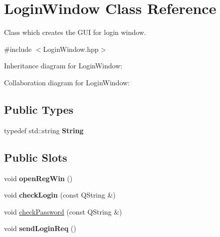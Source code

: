 \hypertarget{classLoginWindow}{}\section{Login\+Window Class Reference}
\label{classLoginWindow}


Class which creates the G\+UI for login window.  




{\ttfamily \#include $<$Login\+Window.\+hpp$>$}



Inheritance diagram for Login\+Window\+:


Collaboration diagram for Login\+Window\+:
\subsection*{Public Types}
\begin{DoxyCompactItemize}
\item 
typedef std\+::string {\bfseries String}\hypertarget{classLoginWindow_a9d5191a38906ea9c5375c1029cfd9d4d}{}\label{classLoginWindow_a9d5191a38906ea9c5375c1029cfd9d4d}

\end{DoxyCompactItemize}
\subsection*{Public Slots}
\begin{DoxyCompactItemize}
\item 
void {\bfseries open\+Reg\+Win} ()\hypertarget{classLoginWindow_abe06ec97d678045c810e2ac6033ee9c0}{}\label{classLoginWindow_abe06ec97d678045c810e2ac6033ee9c0}

\item 
void {\bfseries check\+Login} (const Q\+String \&)\hypertarget{classLoginWindow_a01edb22f1bf6dfdf3bd0811f6c878330}{}\label{classLoginWindow_a01edb22f1bf6dfdf3bd0811f6c878330}

\item 
void \hyperlink{classLoginWindow_ad5a16b9244af77d36f98a4f48d3d423d}{check\+Password} (const Q\+String \&)
\item 
void {\bfseries send\+Login\+Req} ()\hypertarget{classLoginWindow_ac6dc94a63017e4e500b7ec0cbd4cac33}{}\label{classLoginWindow_ac6dc94a63017e4e500b7ec0cbd4cac33}

\end{DoxyCompactItemize}
